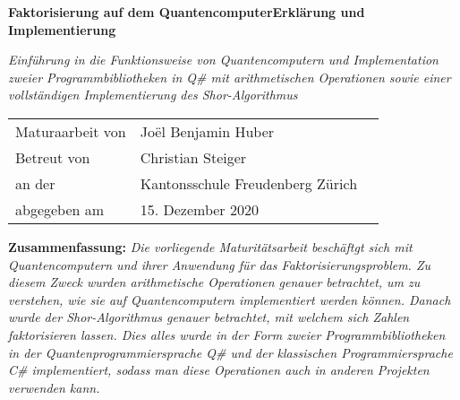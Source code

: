 \begin{titlepage}
    \centering
    {\huge \textbf{Faktorisierung auf dem Quantencomputer\newline Erklärung und Implementierung}}
    \vspace{1cm}
    \newline
    \begin{minipage}[c]{01\textwidth}
    {\LARGE\textit{Einführung in die Funktionsweise von Quantencomputern und Implementation zweier Programmbibliotheken in Q\# mit arithmetischen Operationen sowie einer vollständigen Implementierung des Shor-Algorithmus}}
    \end{minipage}
    \vspace{1cm}
    \newline
    {\Large \begin{tabular}{l@{}ll}
        Maturaarbeit von \; \; &  Joël Benjamin Huber & \\
        Betreut von & Christian Steiger & \\
        an der & Kantonsschule Freudenberg Zürich & \\
        abgegeben am & 15. Dezember 2020 & \\
    \end{tabular}
    }
    \vspace{3cm}
    \newline
    \begin{minipage}[c]{1\textwidth}
    {
        \textbf{Zusammenfassung: } \textit{Die vorliegende Maturitätsarbeit beschäftgt sich mit Quantencomputern und ihrer Anwendung für das Faktorisierungsproblem. Zu diesem Zweck wurden arithmetische Operationen genauer betrachtet, um zu verstehen, wie sie auf Quantencomputern implementiert werden können. Danach wurde der Shor-Algorithmus genauer betrachtet, mit welchem sich Zahlen faktorisieren lassen. Dies alles wurde in der Form zweier Programmbibliotheken in der Quantenprogrammiersprache Q\# und der klassischen Programmiersprache C\# implementiert, sodass man diese Operationen auch in anderen Projekten verwenden kann. }
    }
    \end{minipage}
\end{titlepage}